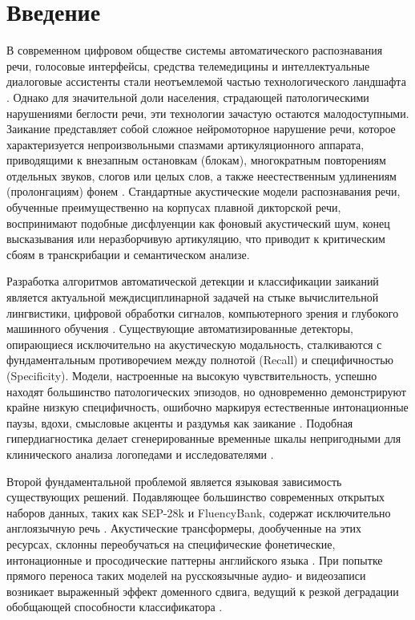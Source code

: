 \documentclass[a4paper,14pt]{extarticle}
\begin{document}
	
	
	\setcounter{page}{2}
	\tableofcontents
	\newpage
	
	\section*{Введение}
	
	В современном цифровом обществе системы автоматического распознавания речи, голосовые интерфейсы, средства телемедицины и интеллектуальные диалоговые ассистенты стали неотъемлемой частью технологического ландшафта \cite{wav2vec, whisper}. Однако для значительной доли населения, страдающей патологическими нарушениями беглости речи, эти технологии зачастую остаются малодоступными. Заикание представляет собой сложное нейромоторное нарушение речи, которое характеризуется непроизвольными спазмами артикуляционного аппарата, приводящими к внезапным остановкам (блокам), многократным повторениям отдельных звуков, слогов или целых слов, а также неестественным удлинениям (пролонгациям) фонем \cite{sep28k}. Стандартные акустические модели распознавания речи, обученные преимущественно на корпусах плавной дикторской речи, воспринимают подобные дисфлуенции как фоновый акустический шум, конец высказывания или неразборчивую артикуляцию, что приводит к критическим сбоям в транскрибации и семантическом анализе.
	
	Разработка алгоритмов автоматической детекции и классификации заиканий является актуальной междисциплинарной задачей на стыке вычислительной лингвистики, цифровой обработки сигналов, компьютерного зрения и глубокого машинного обучения \cite{ivankin, sep28k}. Существующие автоматизированные детекторы, опирающиеся исключительно на акустическую модальность, сталкиваются с фундаментальным противоречием между полнотой (Recall) и специфичностью (Specificity). Модели, настроенные на высокую чувствительность, успешно находят большинство патологических эпизодов, но одновременно демонстрируют крайне низкую специфичность, ошибочно маркируя естественные интонационные паузы, вдохи, смысловые акценты и раздумья как заикание \cite{ivankin}. Подобная гипердиагностика делает сгенерированные временные шкалы непригодными для клинического анализа логопедами и исследователями \cite{ivankin}.
	
	Второй фундаментальной проблемой является языковая зависимость существующих решений. Подавляющее большинство современных открытых наборов данных, таких как SEP-28k и FluencyBank, содержат исключительно англоязычную речь \cite{sep28k}. Акустические трансформеры, дообученные на этих ресурсах, склонны переобучаться на специфические фонетические, интонационные и просодические паттерны английского языка \cite{ivankin}. При попытке прямого переноса таких моделей на русскоязычные аудио- и видеозаписи возникает выраженный эффект доменного сдвига, ведущий к резкой деградации обобщающей способности классификатора \cite{ivankin}.
	
\end{document}
